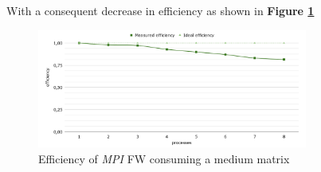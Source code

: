 With a consequent decrease in efficiency as shown in \textbf{Figure \ref*{fig:mpi-efficiency}}
\begin{figure}[h!]
\centering                                                                        
\includegraphics[width=3.5in]{diagrams/mpi-efficiency}
\captionsetup{justification=centering}                                                                                                                                   
\caption{Efficiency of \emph{MPI} FW consuming a medium matrix}                                                                                                                                            
\label{fig:mpi-efficiency}                                                                                                                                                           
\end{figure}























































